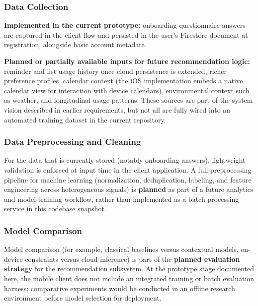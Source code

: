 \subsubsection{Data Collection}

\textbf{Implemented in the current prototype:} onboarding questionnaire answers are
captured in the client flow and persisted in the user's Firestore document at registration,
alongside basic account metadata.

\vspace{0.2cm}

\textbf{Planned or partially available inputs for future recommendation logic:} reminder
and list usage history once cloud persistence is extended, richer preference profiles,
calendar context (the iOS implementation embeds a native calendar view for interaction
with device calendars), environmental context such as weather, and longitudinal usage
patterns. These sources are part of the system vision described in earlier requirements,
but not all are fully wired into an automated training dataset in the current repository.

\subsubsection{Data Preprocessing and Cleaning}

For the data that is currently stored (notably onboarding answers), lightweight validation
is enforced at input time in the client application. A full preprocessing pipeline for
machine learning (normalization, deduplication, labeling, and feature engineering across
heterogeneous signals) is \textbf{planned} as part of a future analytics and model-training
workflow, rather than implemented as a batch processing service in this codebase snapshot.

\subsubsection{Model Comparison}

Model comparison (for example, classical baselines versus contextual models, on-device
constraints versus cloud inference) is part of the \textbf{planned evaluation strategy}
for the recommendation subsystem. At the prototype stage documented here, the mobile
client does not include an integrated training or batch evaluation harness; comparative
experiments would be conducted in an offline research environment before model selection
for deployment.

